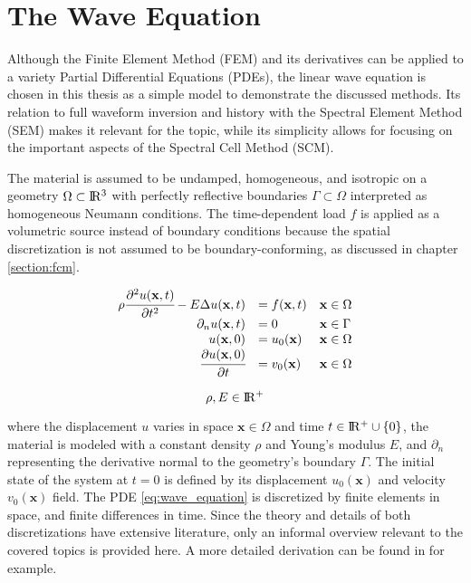 %
\section{The Wave Equation}
\label{section:wave_equation}
%

Although the Finite Element Method (FEM) and its derivatives can be applied to a variety Partial Differential Equations (PDEs), the linear wave equation is chosen in this thesis as a simple model to demonstrate the discussed methods.
Its relation to full waveform inversion and history with the Spectral Element Method (SEM) makes it relevant for the topic, while its simplicity allows for focusing on the important aspects of the Spectral Cell Method (SCM).

The material is assumed to be undamped, homogeneous, and isotropic on a geometry $\Omega \subset \rm I\!R^3$ with perfectly reflective boundaries $\Gamma \subset \Omega$ interpreted as homogeneous Neumann conditions. The time-dependent load $f$ is applied as a volumetric source instead of boundary conditions because the spatial discretization is not assumed to be boundary-conforming, as discussed in chapter \ref{section:fcm}.

\begin{equation} \label{eq:wave_equation}
	\begin{array}{rll}
		\rho \cfrac{\partial^2 u(\mathbf x,t)}{\partial t^2} - E \Delta u(\mathbf x, t) &= f(\mathbf x, t)
		& \mathbf x \in \Omega \\
		\partial_n u(\mathbf x, t) &= 0
		& \mathbf x \in \Gamma \\
		u(\mathbf x, 0) &= u_0(\mathbf x)
		& \mathbf x \in \Omega \\
		\cfrac{\partial u(\mathbf x, 0)}{\partial t} &= v_0(\mathbf x)
		& \mathbf x \in \Omega \\
	\end{array}
\end{equation}

\begin{equation}
	\rho, E \in \rm I\!R^+
\end{equation}

where the displacement $u$ varies in space $\mathbf x \in \Omega$ and time $t \in \rm I\!R^+ \cup \{0\}$, the material is modeled with a constant density $\rho$ and Young's modulus $E$, and $\partial_n$ representing the derivative normal to the geometry's boundary $\Gamma$. The initial state of the system at $t=0$ is defined by its displacement $u_0(\mathbf x)$ and velocity $v_0(\mathbf x)$ field.
The PDE \ref{eq:wave_equation} is discretized by finite elements in space, and finite differences in time. Since the theory and details of both discretizations have extensive literature, only an informal overview relevant to the covered topics is provided here. A more detailed derivation can be found in \cite{Larson2013} for example.

